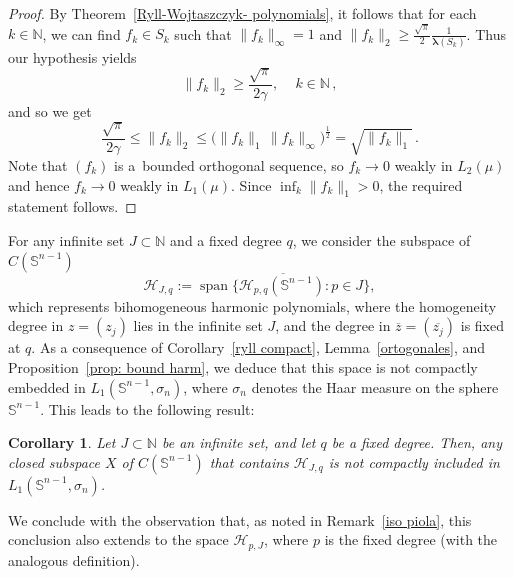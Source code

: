 \documentclass[12pt]{amsart}
\numberwithin{subsection}{section}
\newtheorem{corollary}[theorem]{Corollary}
\theoremstyle{definition}
\theoremstyle{remark}
\begin{document}
\begin{proof}
By Theorem~\ref{Ryll-Wojtaszczyk- polynomials}, it follows that for each  $k\in \mathbb{N} $, we can find  $f_k \in S_k $ such that
$\|f_k\|_\infty=1 $ and $\|f_k\|_2 \ge \frac{\sqrt{\pi}}{2}   \frac{1}{\boldsymbol{\lambda}(S_k)} $. Thus our hypothesis yields
\[
\|f_k\|_2 \ge \frac{\sqrt{\pi}}{2\gamma}, \quad\, k\in \mathbb{N}\,,
\]
and so we get
\[
\frac{\sqrt{\pi}}{2\gamma} \leq \|f_k\|_2 \leq \big(\|f_k\|_1\,
\|f_k\|_\infty\big)^{\frac{1}{2}} = \sqrt{\|f_k\|_1}\,.
\]
Note that $(f_k) $ is a~bounded orthogonal sequence, so  $f_k \to 0 $ weakly in  $L_2(\mu) $ and hence  $f_k\to 0 $ weakly in  $L_1(\mu)$.
Since $\inf_k \|f_k\|_1 >0 $, the required  statement follows.
\end{proof}


For any infinite set $J \subset \mathbb{N}$ and a fixed degree $q$, we consider the subspace of $C(\mathbb{S}^{n-1})$
\[
\mathcal{H}_{J,q} := \overline{\operatorname{span}\big\{ \mathcal{H}_{p,q}(\mathbb{S}^{n-1}) : p \in J \big\}},
\]
which represents bihomogeneous harmonic polynomials, where the homogeneity degree in $z = (z_j) $ lies in the infinite set  $J$, and
the degree in $ \overline{z} = (\overline{z_j}) $ is fixed at  $ q $. As a consequence of Corollary~\ref{ryll compact}, Lemma~\ref{ortogonales},
and Proposition~\ref{prop: bound harm}, we deduce that this space is not compactly embedded in  $ L_1(\mathbb{S}^{n-1}, \sigma_n) $, where
$\sigma_n $ denotes the Haar measure on the sphere  $\mathbb{S}^{n-1} $. This leads to the following result:


\begin{corollary} \label{coro: inclusion no compacta}
Let  $J \subset \mathbb{N} $ be an infinite set, and let  $q$ be a fixed degree. Then, any closed subspace  $X $ of $C(\mathbb{S}^{n-1})$
that contains $ \mathcal{H}_{J,q} $ is not compactly included in  $L_1(\mathbb{S}^{n-1}, \sigma_n)$.
\end{corollary}


We conclude with the observation that, as noted in Remark~\ref{iso piola}, this conclusion also extends to the space $\mathcal{H}_{p,J}$,
where $p$ is the fixed degree (with the analogous definition).

\end{document}
